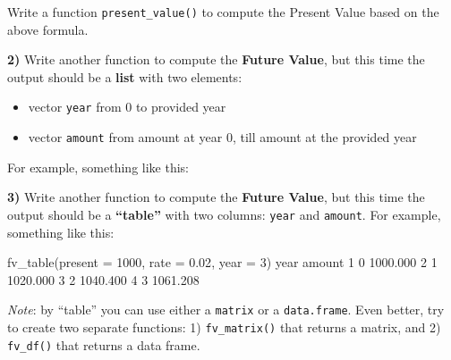\documentclass[
]{book}
\newenvironment{Shaded}{\begin{snugshade}}{\end{snugshade}}
\newcommand{\AttributeTok}[1]{\textcolor[rgb]{0.77,0.63,0.00}{#1}}
\newcommand{\DecValTok}[1]{\textcolor[rgb]{0.00,0.00,0.81}{#1}}
\newcommand{\FloatTok}[1]{\textcolor[rgb]{0.00,0.00,0.81}{#1}}
\newcommand{\FunctionTok}[1]{\textcolor[rgb]{0.00,0.00,0.00}{#1}}
\newcommand{\NormalTok}[1]{#1}
\newcommand{\SpecialCharTok}[1]{\textcolor[rgb]{0.00,0.00,0.00}{#1}}
\begin{document}
Write a function \texttt{present\_value()} to compute the Present Value based on
the above formula.

\textbf{2)} Write another function to compute the \textbf{Future Value}, but this time
the output should be a \textbf{list} with two elements:

\begin{itemize}
\item
  vector \texttt{year} from 0 to provided year
\item
  vector \texttt{amount} from amount at year 0, till amount at the
  provided year
\end{itemize}

For example, something like this:

\begin{Shaded}
\end{Shaded}

\textbf{3)} Write another function to compute the \textbf{Future Value}, but this time
the output should be a \textbf{``table''} with two columns: \texttt{year} and \texttt{amount}. For
example, something like this:

\begin{Shaded}
\begin{Highlighting}[]
\FunctionTok{fv\_table}\NormalTok{(}\AttributeTok{present =} \DecValTok{1000}\NormalTok{, }\AttributeTok{rate =} \FloatTok{0.02}\NormalTok{, }\AttributeTok{year =} \DecValTok{3}\NormalTok{)}
\NormalTok{  year   amount}
\DecValTok{1}    \DecValTok{0} \FloatTok{1000.000}
\DecValTok{2}    \DecValTok{1} \FloatTok{1020.000}
\DecValTok{3}    \DecValTok{2} \FloatTok{1040.400}
\DecValTok{4}    \DecValTok{3} \FloatTok{1061.208}
\end{Highlighting}
\end{Shaded}

\emph{Note}: by ``table'' you can use either a \texttt{matrix} or a \texttt{data.frame}. Even better,
try to create two separate functions: 1) \texttt{fv\_matrix()} that returns a matrix,
and 2) \texttt{fv\_df()} that returns a data frame.
\end{document}
